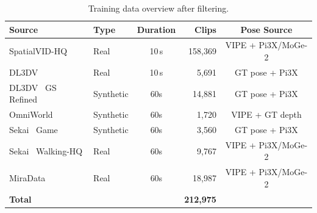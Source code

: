 \begin{table}[h]
  \centering
  \caption{Training data overview after filtering.}
  \label{tab:data_overview}
  \footnotesize
  \begin{tabular}{llcrc}
    \toprule
    Source & Type & Duration & Clips & Pose Source \\
    \midrule
    SpatialVID-HQ~\citep{spatialvid}  & Real           & 10\,s & 158,369 & VIPE + Pi3X/MoGe-2 \\
    DL3DV~\citep{dl3dv}               & Real           & 10\,s & 5,691   & GT pose + Pi3X \\
    DL3DV~\citep{dl3dv} GS Refined    & Synthetic      & 60s & 14,881  & GT pose + Pi3X \\
    OmniWorld~\citep{omniworld}       & Synthetic      & 60s & 1,720   & VIPE + GT depth \\
    Sekai~\citep{sekai} Game          & Synthetic      & 60s & 3,560   & GT pose + Pi3X \\
    Sekai~\citep{sekai} Walking-HQ       & Real           & 60s & 9,767   & VIPE + Pi3X/MoGe-2 \\
    MiraData~\citep{miradata}         & Real & 60s & 18,987  & VIPE + Pi3X/MoGe-2 \\
    \midrule
    \textbf{Total}       &                &       & \textbf{212,975} & \\
    \bottomrule
  \end{tabular}
\end{table}

